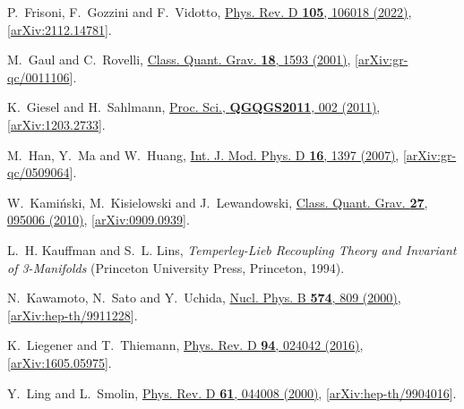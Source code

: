 \documentclass[graybox, secnum]{svmult}
\begin{document}
\begin{thebibliography}{99}
  P.~Frisoni, F.~Gozzini and F.~Vidotto, %
  \href{https://doi.org/10.1103/PhysRevD.105.106018}{Phys. Rev. D {\bfseries
  105}, 106018 (2022)},
  [\href{http://arxiv.org/abs/2112.14781}{arXiv:2112.14781}].

M.~Gaul and C.~Rovelli, %
  \href{http://dx.doi.org/10.1088/0264-9381/18/9/301}{Class. Quant. Grav.
  {\bfseries 18}, 1593 (2001)},
  [\href{http://arxiv.org/abs/gr-qc/0011106}{arXiv:gr-qc/0011106}].

K.~Giesel and H.~Sahlmann,
  \href{http://dx.doi.org/10.22323/1.140.0002}{Proc.
  Sci., {\bfseries QGQGS2011}, 002 (2011)},
  [\href{http://arxiv.org/abs/1203.2733}{arXiv:1203.2733}].

M.~Han, Y.~Ma and W.~Huang,
  \href{http://dx.doi.org/10.1142/S0218271807010894}{Int. J. Mod. Phys. D
  {\bfseries 16}, 1397 (2007)},
  [\href{http://arxiv.org/abs/gr-qc/0509064}{arXiv:gr-qc/0509064}].

W.~Kami{\'n}ski, M.~Kisielowski and J.~Lewandowski, %
  \href{http://dx.doi.org/10.1088/0264-9381/27/9/095006}{Class. Quant. Grav.
  {\bfseries 27}, 095006 (2010)},
  [\href{http://arxiv.org/abs/0909.0939}{arXiv:0909.0939}].

L.~H. Kauffman and S.~L. Lins, {\em Temperley-Lieb Recoupling Theory and
Invariant of 3-Manifolds} (Princeton University Press, Princeton, 1994).

N.~Kawamoto, N.~Sato and Y.~Uchida, %
  \href{http://dx.doi.org/10.1016/S0550-3213(00)00017-1}{Nucl. Phys. B
  {\bfseries 574}, 809 (2000)},
  [\href{http://arxiv.org/abs/hep-th/9911228}{arXiv:hep-th/9911228}].

K.~Liegener and T.~Thiemann, %
  \href{http://dx.doi.org/10.1103/PhysRevD.94.024042}{Phys.
  Rev. D {\bfseries 94}, 024042 (2016)},
  [\href{http://arxiv.org/abs/1605.05975}{arXiv:1605.05975}].

Y.~Ling and L.~Smolin,
  \href{https://doi.org/10.1103/PhysRevD.61.044008}{Phys. Rev. D {\bfseries
  61}, 044008 (2000)},
  [\href{http://arxiv.org/hep-th/9904016}{arXiv:hep-th/9904016}].
    

\end{thebibliography}
\end{document}
